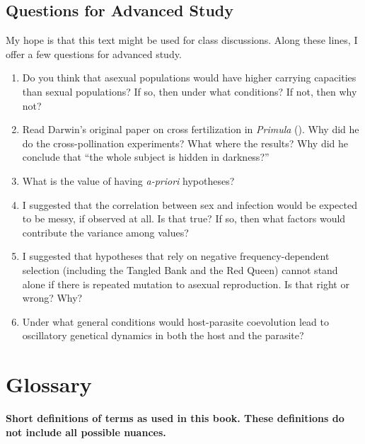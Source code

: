 \documentclass[
  letterpaper,
]{book}
\providecommand{\tightlist}{%
  \setlength{\itemsep}{0pt}\setlength{\parskip}{0pt}}\usepackage{longtable,booktabs,array}
\begin{document}
\section{Questions for Advanced
Study}\label{questions-for-advanced-study}

My hope is that this text might be used for class discussions. Along
these lines, I offer a few questions for advanced study.

\begin{enumerate}
\def\labelenumi{\arabic{enumi}.}
\tightlist
\item
  Do you think that asexual populations would have higher carrying
  capacities than sexual populations? If so, then under what conditions?
  If not, then why not?
\item
  Read Darwin's original paper on cross fertilization in \emph{Primula}
  (). Why did he do the
  cross-pollination experiments? What where the results? Why did he
  conclude that ``the whole subject is hidden in darkness?''\\
\item
  What is the value of having \emph{a-priori} hypotheses?
\item
  I suggested that the correlation between sex and infection would be
  expected to be messy, if observed at all. Is that true? If so, then
  what factors would contribute the variance among values?\\
\item
  I suggested that hypotheses that rely on negative frequency-dependent
  selection (including the Tangled Bank and the Red Queen) cannot stand
  alone if there is repeated mutation to asexual reproduction. Is that
  right or wrong? Why?
\item
  Under what general conditions would host-parasite coevolution lead to
  oscillatory genetical dynamics in both the host and the parasite?
\end{enumerate}


\chapter*{Glossary}\label{sec-glossary}


\textbf{Short definitions of terms as used in this book. These
definitions do not include all possible nuances.}
\end{document}
